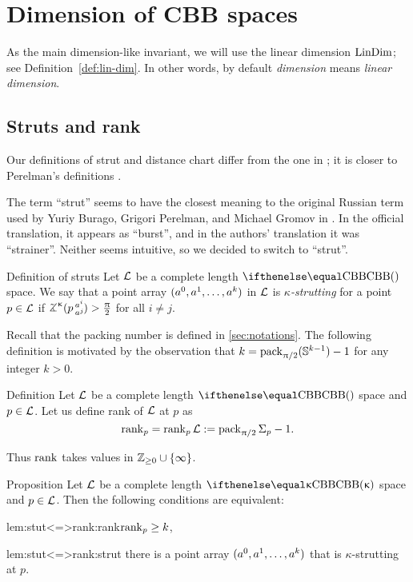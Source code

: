 \chapter{Dimension of CBB spaces}

As the main dimension-like invariant, we will use the linear dimension $\mathop{\rm LinDim}\nolimits$; 
see Definition~\ref{def:lin-dim}. In other words, by default {}\emph{dimension} means {}\emph{linear dimension}. 

\section{Struts and rank}\label{sec:struts+rank}

Our definitions of strut 
and distance chart 
differ from the one in \cite{burago-gromov-perelman};
it is closer to Perelman's definitions \cite{perelman:spaces2,perelman:morse}.

The term ``strut'' seems to have the closest meaning to the original Russian term used by Yuriy Burago, Grigori Perelman, and Michael Gromov in \cite{burago-gromov-perelman}.
In the official translation,
it appears as ``burst'', 
and in the authors' translation it was ``strainer''.
Neither seems intuitive, 
so we decided to switch to ``strut''.

\begin{thm}{Definition of struts}\label{def:strut-I}
Let $\mathcal{L}$ be a complete length $\Alex{}$ space.
We say that a point array $(a^0,a^1,\dots,a^\kay)$ in $\mathcal{L}$
 is \emph{$\kappa$-strutting} for a point $p\in\spc{L}$ if $\angk\kappa p {a^i}{a^j}>\tfrac\pi2$ for all $i\ne j$.
\end{thm} 

Recall that the packing number is defined in \ref{sec:notations}.
The following definition is motivated by the observation that $k\z=\pack_{\pi/2}(\SS^{k-1})-1$ for any integer $k>0$. 

\begin{thm}{Definition}\label{def:rank}
Let $\mathcal{L}$ be a complete length $\Alex{}$ space
and $p\in \spc{L}$.
Let us define rank of $\mathcal{L}$ at $p$ as 
\[\mathop{\rm rank}\nolimits_p=\mathop{\rm rank}\nolimits_p\mathcal{L}
:=
\mathop{\rm pack}\nolimits_{\uppi/2}\Sigma_p-1.\]

\end{thm}

Thus $\mathop{\rm rank}\nolimits$ takes values in $\ZZ_{\ge0}\cup\{\infty\}$.

\begin{thm}{Proposition}\label{prop:stutt}
Let $\mathcal{L}$ be a complete length $\Alex{\kappa}$ space 
and $p\in \spc{L}$.
Then the following conditions are equivalent:

\begin{subthm}{lem:stut<=>rank:rank}$\rank_p\ge\kay$,
\end{subthm}

\begin{subthm}{lem:stut<=>rank:strut}
there is a point array $(a^0,a^1,\dots,a^\kay)$
that is $\kappa$-strutting at $p$. 
\end{subthm}
\end{thm}


